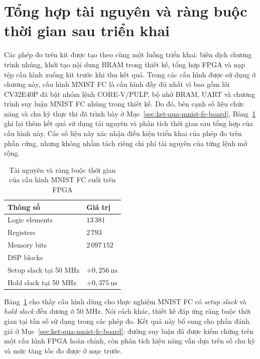 \documentclass[../DoAn.tex]{subfiles}
\begin{document}
\section{Tổng hợp tài nguyên và ràng buộc thời gian sau triển khai}

Các phép đo trên kit được tạo theo cùng một luồng triển khai: biên dịch chương trình nhúng, khởi tạo nội dung BRAM trong thiết kế, tổng hợp FPGA và nạp tệp cấu hình xuống kit trước khi thu kết quả. Trong các cấu hình được sử dụng ở chương này, cấu hình MNIST FC là cấu hình đầy đủ nhất vì bao gồm lõi CV32E40P đã bật nhóm lệnh CORE-V/PULP, bộ nhớ BRAM, UART và chương trình suy luận MNIST FC nhúng trong thiết kế. Do đó, bên cạnh số liệu chức năng và chu kỳ thực thi đã trình bày ở Mục~\ref{sec:ket-qua-mnist-fc-board}, Bảng~\ref{tab:fpga-final-resource-timing} ghi lại thêm kết quả sử dụng tài nguyên và phân tích thời gian sau tổng hợp của cấu hình này. Các số liệu này xác nhận điều kiện triển khai của phép đo trên phần cứng, nhưng không nhằm tách riêng chi phí tài nguyên của từng lệnh mở rộng.

\begin{table}[H]
    \centering
    \footnotesize
    \renewcommand{\arraystretch}{1.15}
    \begin{tabular}{|>{\raggedright\arraybackslash}p{7.20cm}|>{\centering\arraybackslash}p{4.00cm}|}
        \hline
        \textbf{Thông số} & \textbf{Giá trị} \\
        \hline
        Logic elements & \(13\,381\) \\
        \hline
        Registers & \(2\,793\) \\
        \hline
        Memory bits & \(2\,097\,152\) \\
        \hline
        DSP blocks & 16 \\
        \hline
        Setup slack tại 50 MHz & \(+0{,}256~\text{ns}\) \\
        \hline
        Hold slack tại 50 MHz & \(+0{,}375~\text{ns}\) \\
        \hline
    \end{tabular}
    \caption{Tài nguyên và ràng buộc thời gian của cấu hình MNIST FC cuối trên FPGA}
    \label{tab:fpga-final-resource-timing}
\end{table}

Bảng~\ref{tab:fpga-final-resource-timing} cho thấy cấu hình dùng cho thực nghiệm MNIST FC có \textit{setup slack} và \textit{hold slack} đều dương ở 50 MHz. Nói cách khác, thiết kế đáp ứng ràng buộc thời gian tại tần số sử dụng trong các phép đo. Kết quả này bổ sung cho phần đánh giá ở Mục~\ref{sec:ket-qua-mnist-fc-board}: đường suy luận đã được kiểm chứng trên một cấu hình FPGA hoàn chỉnh, còn phân tích hiệu năng vẫn dựa trên số chu kỳ và mức tăng tốc đo được ở mục trước.
\end{document}
